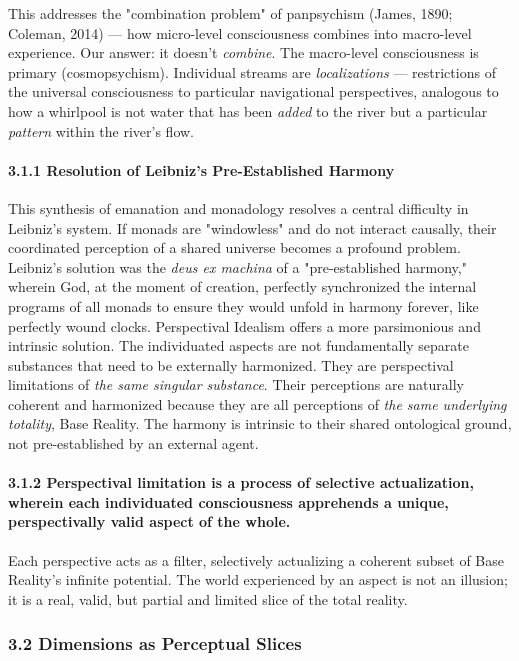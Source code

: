 This addresses the "combination problem" of panpsychism (James, 1890; Coleman, 2014) — how micro-level consciousness combines into macro-level experience. Our answer: it doesn't \textit{combine}. The macro-level consciousness is primary (cosmopsychism). Individual streams are \textit{localizations} — restrictions of the universal consciousness to particular navigational perspectives, analogous to how a whirlpool is not water that has been \textit{added} to the river but a particular \textit{pattern} within the river's flow.


\paragraph*{3.1.1 Resolution of Leibniz's Pre-Established Harmony}


This synthesis of emanation and monadology resolves a central difficulty in Leibniz's system. If monads are "windowless" and do not interact causally, their coordinated perception of a shared universe becomes a profound problem. Leibniz's solution was the \textit{deus ex machina} of a "pre-established harmony," wherein God, at the moment of creation, perfectly synchronized the internal programs of all monads to ensure they would unfold in harmony forever, like perfectly wound clocks. Perspectival Idealism offers a more parsimonious and intrinsic solution. The individuated aspects are not fundamentally separate substances that need to be externally harmonized. They are perspectival limitations of \textit{the same singular substance}. Their perceptions are naturally coherent and harmonized because they are all perceptions of \textit{the same underlying totality}, Base Reality. The harmony is intrinsic to their shared ontological ground, not pre-established by an external agent.


\paragraph*{3.1.2 Perspectival limitation is a process of selective actualization, wherein each individuated consciousness apprehends a unique, perspectivally valid aspect of the whole.}


Each perspective acts as a filter, selectively actualizing a coherent subset of Base Reality's infinite potential. The world experienced by an aspect is not an illusion; it is a real, valid, but partial and limited slice of the total reality.


\subsubsection*{3.2 Dimensions as Perceptual Slices}



